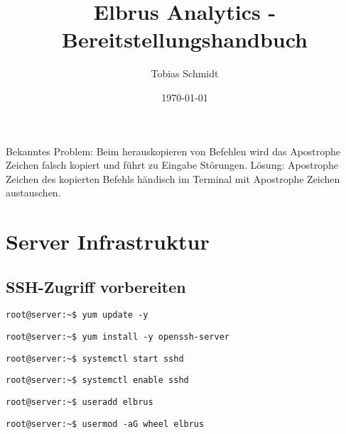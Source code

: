 \documentclass{article}
\begin{document}
	\title{Elbrus Analytics - Bereitstellungshandbuch}
	\author{Tobias Schmidt}
	\date{\today}
	\maketitle
	\newpage
	
	Bekanntes Problem: Beim herauskopieren von Befehlen wird das Apostrophe Zeichen falsch kopiert und führt zu Eingabe Störungen. Lösung: Apostrophe Zeichen des kopierten Befehls händisch im Terminal mit Apostrophe Zeichen austauschen. 
	
	\section[Server Infrastruktur]{Server Infrastruktur}
	\subsection{SSH-Zugriff vorbereiten}
	
	\lstset{style=commands}
	\begin{lstlisting}[caption={Updaten vorhandener Packages.}]
		root@server:~$ yum update -y
	\end{lstlisting}
	
	\lstset{style=commands}
	\begin{lstlisting}[caption={Installieren des 'ssh' Packages.}]
		root@server:~$ yum install -y openssh-server
	\end{lstlisting}

	\lstset{style=commands}
	\begin{lstlisting}[caption={Starten des 'sshd' Services.}]
		root@server:~$ systemctl start sshd
	\end{lstlisting}

	\lstset{style=commands}
	\begin{lstlisting}[caption={Aktivieren des 'sshd' Services.}]
		root@server:~$ systemctl enable sshd
	\end{lstlisting}

	\lstset{style=commands}
	\begin{lstlisting}[caption={Anlegen des Users Elbrus.}]
		root@server:~$ useradd elbrus
	\end{lstlisting}

	\lstset{style=commands}
	\begin{lstlisting}[caption={Hinzufügen des Users Elbrus zu der Gruppe 'wheel'.}]
		root@server:~$ usermod -aG wheel elbrus
	\end{lstlisting}
\end{document}
